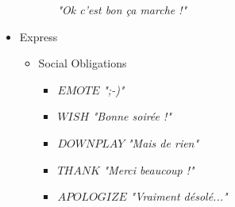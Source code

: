 \begin{itemize}
\begin{itemize}
\begin{itemize}
						\newline \textit{"Ok c'est bon ça marche !"}
				\end{itemize}
		\end{itemize}
	\item Express
		\begin{itemize}
			\item Social Obligations
				\begin{itemize}
					\item $EMOTE$
						\newline \textit{";-)"}
					\item $WISH$
						\newline \textit{"Bonne soirée !"}
					\item $DOWNPLAY$
						\newline \textit{"Mais de rien"}
					\item $THANK$
						\newline \textit{"Merci beaucoup !"}
					\item $APOLOGIZE$
						\newline \textit{"Vraiment désolé..."}
				\end{itemize}
		\end{itemize}
\end{itemize}